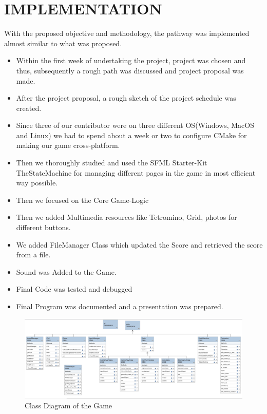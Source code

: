 \newpage
\section{IMPLEMENTATION}

With the proposed objective and methodology, the pathway was implemented almost similar to what was proposed.

\begin{itemize}
	\item Within the first week of undertaking the project, project was chosen and thus,
	subsequently a rough path was discussed and project proposal was made.
	\item After the project proposal, a rough sketch of the project schedule was
	created.
	\item Since three of our contributor were on three different OS(Windows, MacOS and Linux) we had to spend about a week or two to configure CMake for making our game cross-platform.
	\item Then we thoroughly studied and used the SFML Starter-Kit TheStateMachine for managing different pages in the game in most efficient way possible.
	\item Then we focused on the Core Game-Logic
	\item Then we added Multimedia resources like Tetromino, Grid, photos for different buttons.
	\item We added FileManager Class which updated the Score and retrieved the score from a file.
	\item Sound was Added to the Game.
	\item Final Code was tested and debugged
	\item Final Program was documented and a presentation was prepared.
\end{itemize}

\begin{figure}[H]
	\centering
	\includegraphics[width=1.2\textwidth]{images/ClassDiagram}
	\caption{Class Diagram of the Game}
\end{figure}


